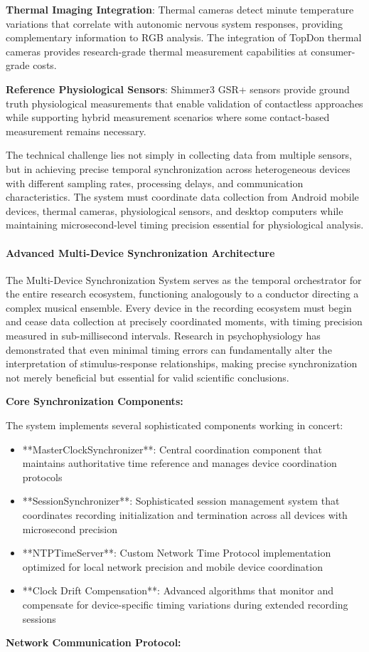 \documentclass[12pt,a4paper]{report}
\begin{document}
\textbf{Thermal Imaging Integration}: Thermal cameras detect minute temperature variations that correlate with autonomic
nervous system responses, providing complementary information to RGB analysis. The integration of TopDon thermal cameras
provides research-grade thermal measurement capabilities at consumer-grade costs.

\textbf{Reference Physiological Sensors}: Shimmer3 GSR+ sensors provide ground truth physiological measurements that enable
validation of contactless approaches while supporting hybrid measurement scenarios where some contact-based measurement
remains necessary.

The technical challenge lies not simply in collecting data from multiple sensors, but in achieving precise temporal
synchronization across heterogeneous devices with different sampling rates, processing delays, and communication
characteristics. The system must coordinate data collection from Android mobile devices, thermal cameras, physiological
sensors, and desktop computers while maintaining microsecond-level timing precision essential for physiological
analysis.

\paragraph{Advanced Multi-Device Synchronization Architecture}

The Multi-Device Synchronization System serves as the temporal orchestrator for the entire research ecosystem,
functioning analogously to a conductor directing a complex musical ensemble. Every device in the recording ecosystem
must begin and cease data collection at precisely coordinated moments, with timing precision measured in sub-millisecond
intervals. Research in psychophysiology has demonstrated that even minimal timing errors can fundamentally alter the
interpretation of stimulus-response relationships, making precise synchronization not merely beneficial but essential
for valid scientific conclusions.

\textbf{Core Synchronization Components:}

The system implements several sophisticated components working in concert:

\begin{itemize}
\item **MasterClockSynchronizer**: Central coordination component that maintains authoritative time reference and manages
  device coordination protocols
\item **SessionSynchronizer**: Sophisticated session management system that coordinates recording initialization and
  termination across all devices with microsecond precision
\item **NTPTimeServer**: Custom Network Time Protocol implementation optimized for local network precision and mobile device
  coordination
\item **Clock Drift Compensation**: Advanced algorithms that monitor and compensate for device-specific timing variations
  during extended recording sessions

\end{itemize}
\textbf{Network Communication Protocol:}
\end{document}
